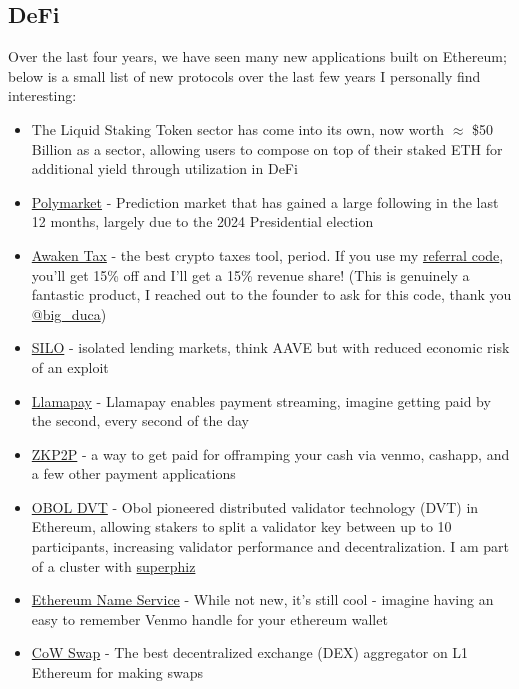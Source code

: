 \documentclass[12pt]{article}
\begin{document}
\subsection{DeFi}
Over the last four years, we have seen many new applications built on Ethereum; below is a small list of new protocols over the last few years I personally find interesting: 

\begin{itemize}
    \item The Liquid Staking Token sector has come into its own, now worth $\approx$ \$50 Billion as a sector, allowing users to compose on top of their staked ETH for additional yield through utilization in DeFi
    \item \href{https://x.com/Polymarket}{Polymarket} - Prediction market that has gained a large following in the last 12 months, largely due to the 2024 Presidential election
    \item \href{https://x.com/AwakenTax}{Awaken Tax} - the best crypto taxes tool, period. If you use my \href{https://awaken.tax?ref=dm61olox}{referral code}, you'll get 15\% off and I'll get a 15\% revenue share! (This is genuinely a fantastic product, I reached out to the founder to ask for this code, thank you \href{https://x.com/big_duca}{@big\_duca})
    \item \href{https://x.com/SiloFinance}{SILO} - isolated lending markets, think AAVE but with reduced economic risk of an exploit
    \item \href{https://x.com/llamapay_io}{Llamapay} - Llamapay enables payment streaming, imagine getting paid by the second, every second of the day
    \item \href{https://x.com/zkp2p}{ZKP2P} - a way to get paid for offramping your cash via venmo, cashapp, and a few other payment applications
    \item \href{https://x.com/Obol_Collective}{OBOL DVT} - Obol pioneered distributed validator technology (DVT) in Ethereum, allowing stakers to split a validator key between up to 10 participants, increasing validator performance and decentralization. I am part of a cluster with \href{https://x.com/superphiz/status/1730574043508597229}{superphiz}
    \item \href{https://x.com/ensdomains}{Ethereum Name Service} - While not new, it's still cool - imagine having an easy to remember Venmo handle for your ethereum wallet
    \item \href{https://x.com/CoWSwap}{CoW Swap} - The best decentralized exchange (DEX) aggregator on L1 Ethereum for making swaps

\end{itemize}
\end{document}

